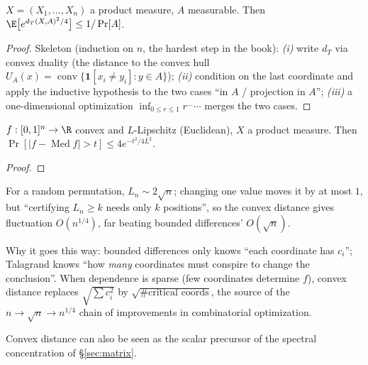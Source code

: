 
\begin{theorem}\label{thm:talagrand}
$X=(X_1,\dots,X_n)$ a product measure, $A$ measurable. Then $\E\big[e^{d_T(X,A)^2/4}\big]\le 1/\Pr[A]$.
\end{theorem}
\begin{proof}
Skeleton (induction on $n$, the hardest step in the book): \emph{(i)} write $d_T$ via convex duality (the distance to
the convex hull $U_A(x)=\operatorname{conv}\{\mathbf 1[x_i\ne y_i]:y\in A\}$); \emph{(ii)} condition on the last coordinate
and apply the inductive hypothesis to the two cases ``in $A$ / projection in $A$''; \emph{(iii)} a one-dimensional
optimization $\inf_{0\le r\le1}r^{\dots}\cdots$ merges the two cases. 
\end{proof}

\begin{corollary}\label{cor:convex-lip}
$f:[0,1]^n\to\R$ convex and $L$-Lipschitz (Euclidean), $X$ a product measure. Then
$\Pr[|f-\operatorname{Med}f|>t]\le 4e^{-t^2/4L^2}$.
\end{corollary}
\begin{proof}\end{proof}

\begin{example}\label{ex:lis}
For a random permutation, $L_n\sim 2\sqrt n$; changing one value moves it by at most $1$, but ``certifying $L_n\ge k$ needs
only $k$ positions'', so the convex distance gives fluctuation $O(n^{1/4})$, far beating bounded differences' $O(\sqrt n)$.
\end{example}

\begin{strand}
Why it goes this way: bounded differences only knows ``each coordinate has $c_i$''; Talagrand knows ``how \emph{many}
coordinates must conspire to change the conclusion''. When dependence is sparse (few coordinates determine $f$), convex
distance replaces $\sqrt{\sum c_i^2}$ by $\sqrt{\#\text{critical coords}}$, the source of the $n\to\sqrt n\to n^{1/4}$
chain of improvements in combinatorial optimization.
\end{strand}

%
\quad Convex distance can also be seen as the scalar precursor of the spectral concentration of §\ref{sec:matrix}.
